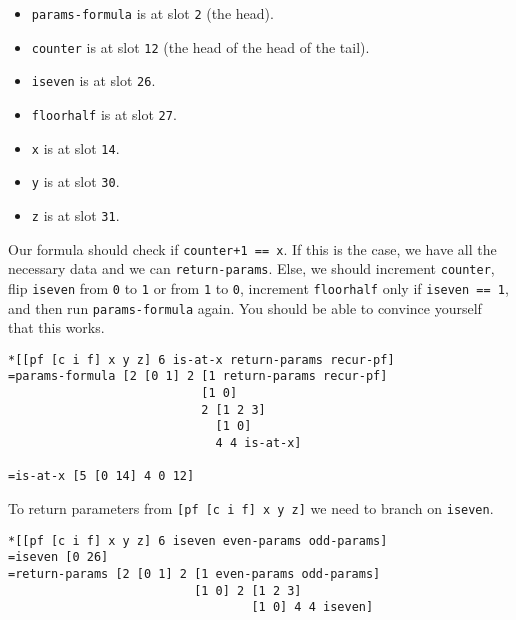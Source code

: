 \documentclass[twoside]{article}
\begin{document}
\begin{itemize}
  \item \lstinline[style=inlinecode]{params-formula} is at slot \lstinline[style=inlinecode]{2} (the head).
  \item \lstinline[style=inlinecode]{counter} is at slot \lstinline[style=inlinecode]{12} (the head of the head of the tail).
  \item \lstinline[style=inlinecode]{iseven} is at slot \lstinline[style=inlinecode]{26}.
  \item \lstinline[style=inlinecode]{floorhalf} is at slot \lstinline[style=inlinecode]{27}.
  \item \lstinline[style=inlinecode]{x} is at slot \lstinline[style=inlinecode]{14}.
  \item \lstinline[style=inlinecode]{y} is at slot \lstinline[style=inlinecode]{30}.
  \item \lstinline[style=inlinecode]{z} is at slot \lstinline[style=inlinecode]{31}.
\end{itemize}

Our formula should check if \lstinline[style=inlinecode]{counter+1 == x}. If this is the case, we have all the necessary data and we can \lstinline[style=inlinecode]{return-params}. Else, we should increment \lstinline[style=inlinecode]{counter}, flip \lstinline[style=inlinecode]{iseven} from \lstinline[style=inlinecode]{0} to \lstinline[style=inlinecode]{1} or from \lstinline[style=inlinecode]{1} to \lstinline[style=inlinecode]{0}, increment \lstinline[style=inlinecode]{floorhalf} only if \lstinline[style=inlinecode]{iseven == 1}, and then run \lstinline[style=inlinecode]{params-formula} again. You should be able to convince yourself that this works.

\begin{lstlisting}[style=listingblock]
*[[pf [c i f] x y z] 6 is-at-x return-params recur-pf]
=params-formula [2 [0 1] 2 [1 return-params recur-pf]
                           [1 0]
                           2 [1 2 3]
                             [1 0]
                             4 4 is-at-x]

=is-at-x [5 [0 14] 4 0 12]
\end{lstlisting}

To return parameters from \lstinline[style=inlinecode]{[pf [c i f] x y z]} we need to branch on \lstinline[style=inlinecode]{iseven}.

\begin{lstlisting}[style=listingblock]
*[[pf [c i f] x y z] 6 iseven even-params odd-params]
=iseven [0 26]
=return-params [2 [0 1] 2 [1 even-params odd-params]
                          [1 0] 2 [1 2 3]
                                  [1 0] 4 4 iseven]
\end{lstlisting}
\end{document}
